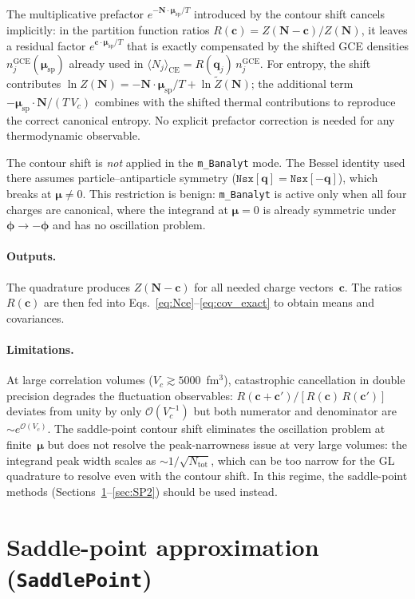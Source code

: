 \documentclass[11pt]{article}
\newcommand{\bphi}{\bm{\phi}}
\newcommand{\bmu}{\bm{\mu}}
\newcommand{\bq}{\mathbf{q}}
\newcommand{\bc}{\mathbf{c}}
\newcommand{\bN}{\mathbf{N}}
\newcommand{\CE}{\mathrm{CE}}
\newcommand{\GCE}{\mathrm{GCE}}
\begin{document}
The multiplicative prefactor $e^{-\bN\cdot\bmu_\mathrm{sp}/T}$ introduced by the contour shift cancels implicitly: in the partition function ratios $R(\bc) = Z(\bN-\bc)/Z(\bN)$, it leaves a residual factor $e^{\bc\cdot\bmu_\mathrm{sp}/T}$ that is exactly compensated by the shifted GCE densities $n_j^{\GCE}(\bmu_\mathrm{sp})$ already used in $\langle N_j\rangle_\CE = R(\bq_j)\,n_j^{\GCE}$.
For entropy, the shift contributes $\ln Z(\bN) = -\bN\cdot\bmu_\mathrm{sp}/T + \ln\tilde{Z}(\bN)$; the additional term $-\bmu_\mathrm{sp}\cdot\bN/(T\,V_c)$ combines with the shifted thermal contributions to reproduce the correct canonical entropy.
No explicit prefactor correction is needed for any thermodynamic observable.

The contour shift is \emph{not} applied in the \texttt{m\_Banalyt} mode.
The Bessel identity used there assumes particle--antiparticle symmetry ($\texttt{Nsx}[\bq] = \texttt{Nsx}[-\bq]$), which breaks at $\bmu \neq 0$.
This restriction is benign: \texttt{m\_Banalyt} is active only when all four charges are canonical, where the integrand at $\bmu = 0$ is already symmetric under $\bphi \to -\bphi$ and has no oscillation problem.

\paragraph{Outputs.}
The quadrature produces $Z(\bN-\bc)$ for all needed charge vectors~$\bc$.
The ratios $R(\bc)$ are then fed into Eqs.~\eqref{eq:Nce}--\eqref{eq:cov_exact} to obtain means and covariances.

\paragraph{Limitations.}
At large correlation volumes ($V_c \gtrsim 5000$~fm$^3$), catastrophic cancellation in double precision degrades the fluctuation observables: $R(\bc+\bc')/[R(\bc)\,R(\bc')]$ deviates from unity by only $\mathcal{O}(V_c^{-1})$ but both numerator and denominator are $\sim e^{\mathcal{O}(V_c)}$.
The saddle-point contour shift eliminates the oscillation problem at finite~$\bmu$ but does not resolve the peak-narrowness issue at very large volumes: the integrand peak width scales as $\sim 1/\sqrt{N_\mathrm{tot}}$, which can be too narrow for the GL quadrature to resolve even with the contour shift.
In this regime, the saddle-point methods (Sections~\ref{sec:SP1}--\ref{sec:SP2}) should be used instead.

\section{Saddle-point approximation (\texttt{SaddlePoint})}
\label{sec:SP1}
\end{document}
